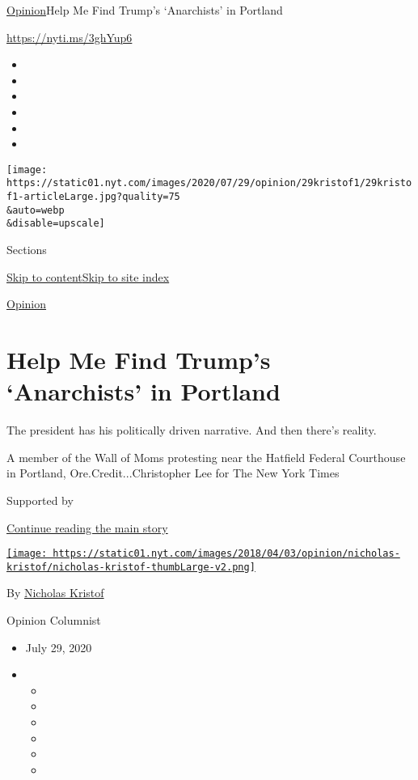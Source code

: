 \href{/section/opinion}{Opinion}\textbar{}Help Me Find Trump's
`Anarchists' in Portland

\href{https://nyti.ms/3ghYup6}{https://nyti.ms/3ghYup6}

\begin{itemize}
\item
\item
\item
\item
\item
\item
\end{itemize}

\texttt{[image: https://static01.nyt.com/images/2020/07/29/opinion/29kristof1/29kristof1-articleLarge.jpg?quality=75\\\&auto=webp\\\&disable=upscale]}

Sections

\protect\hyperlink{site-content}{Skip to
content}\protect\hyperlink{site-index}{Skip to site index}

\href{/section/opinion}{Opinion}

\hypertarget{help-me-find-trumps-anarchists-in-portland}{%
\section{Help Me Find Trump's `Anarchists' in
Portland}\label{help-me-find-trumps-anarchists-in-portland}}

The president has his politically driven narrative. And then there's
reality.

A member of the Wall of Moms protesting near the Hatfield Federal
Courthouse in Portland, Ore.Credit...Christopher Lee for The New York
Times

Supported by

\protect\hyperlink{after-sponsor}{Continue reading the main story}

\href{https://www.nytimes.com/column/nicholas-kristof}{\texttt{[image: https://static01.nyt.com/images/2018/04/03/opinion/nicholas-kristof/nicholas-kristof-thumbLarge-v2.png]}}

By \href{https://www.nytimes.com/column/nicholas-kristof}{Nicholas
Kristof}

Opinion Columnist

\begin{itemize}
\item
  July 29, 2020
\item
  \begin{itemize}
  \item
  \item
  \item
  \item
  \item
  \item
  \end{itemize}
\end{itemize}

